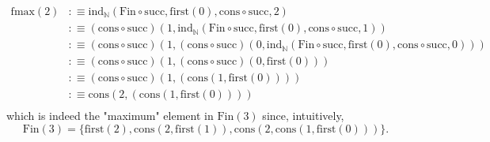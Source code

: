 \documentclass[14pt]{extarticle}
\newcommand{\N}{{\mathbb N}}
\newcommand{\0}{{\mathbf 0}}
\newcommand{\1}{{\mathbf 1}}
\newcommand{\2}{{\mathbf 2}}
\newcommand{\su}{\mathrm{succ}}
\newcommand{\ind}{\mathrm{ind}}
\newcommand{\cons}{\mathrm{cons}}
\begin{document}
\begin{align*}
\text{fmax}(2) &:\equiv \ind_\N(\text{Fin} \circ \su,\text{first}(0),\cons \circ \su, 2) \\
&:\equiv (\cons \circ \su)(1, \ind_\N(\text{Fin} \circ \su,\text{first}(0),\cons \circ \su,1))  \\
&:\equiv (\cons \circ \su)(1, (\cons \circ \su)(0,\ind_\N(\text{Fin} \circ \su,\text{first}(0),\cons \circ \su,0)))  \\
&:\equiv (\cons \circ \su)(1, (\cons \circ \su)(0,\text{first}(0)))  \\
&:\equiv (\cons \circ \su)(1, (\cons(1,\text{first}(0))))  \\
&:\equiv \cons(2, (\cons(1,\text{first}(0))))  \\
\end{align*}
which is indeed the "maximum" element in $\text{Fin}(3)$ since, intuitively, \[\text{Fin}(3) = \Big\{\text{first}(2), \cons(2,\text{first}(1)), \cons(2,\cons(1,\text{first}(0)))\Big\}.\]
\end{document}
